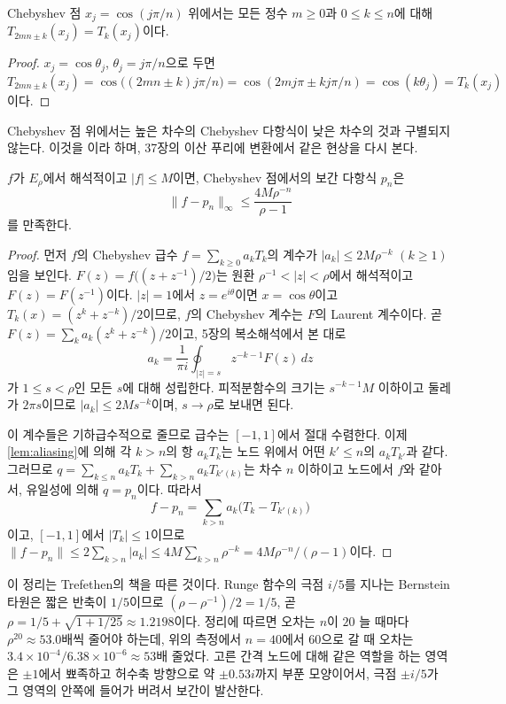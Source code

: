 \begin{lemma}
\label{lem:aliasing}
Chebyshev 점 $x_j=\cos(j\pi/n)$ 위에서는 모든 정수 $m\ge0$과 $0\le k\le n$에 대해 $T_{2mn\pm k}(x_j)=T_k(x_j)$이다.
\end{lemma}

\begin{proof}
$x_j=\cos\theta_j$, $\theta_j=j\pi/n$으로 두면 $T_{2mn\pm k}(x_j)=\cos\bigl((2mn\pm k)j\pi/n\bigr)=\cos(2mj\pi\pm kj\pi/n)=\cos(k\theta_j)=T_k(x_j)$이다.
\end{proof}

Chebyshev 점 위에서는 높은 차수의 Chebyshev 다항식이 낮은 차수의 것과 구별되지 않는다. 이것을 이라 하며, 37장의 이산 푸리에 변환에서 같은 현상을 다시 본다.

\begin{theorem}
\label{thm:cheb-interp-analytic}
$f$가 $E_\rho$에서 해석적이고 $|f|\le M$이면, Chebyshev 점에서의 보간 다항식 $p_n$은
\[
\|f-p_n\|_\infty\le\frac{4M\rho^{-n}}{\rho-1}
\]
를 만족한다.
\end{theorem}

\begin{proof}
먼저 $f$의 Chebyshev 급수 $f=\sum_{k\ge0}a_kT_k$의 계수가 $|a_k|\le2M\rho^{-k}$ $(k\ge1)$임을 보인다. $F(z)=f\bigl((z+z^{-1})/2\bigr)$는 원환 $\rho^{-1}<|z|<\rho$에서 해석적이고 $F(z)=F(z^{-1})$이다. $|z|=1$에서 $z=e^{i\theta}$이면 $x=\cos\theta$이고 $T_k(x)=(z^k+z^{-k})/2$이므로, $f$의 Chebyshev 계수는 $F$의 Laurent 계수이다. 곧 $F(z)=\sum_ka_k(z^k+z^{-k})/2$이고, 5장의 복소해석에서 본 대로
\[
a_k=\frac1{\pi i}\oint_{|z|=s}z^{-k-1}F(z)\,dz
\]
가 $1\le s<\rho$인 모든 $s$에 대해 성립한다. 피적분함수의 크기는 $s^{-k-1}M$ 이하이고 둘레가 $2\pi s$이므로 $|a_k|\le2Ms^{-k}$이며, $s\to\rho$로 보내면 된다.

이 계수들은 기하급수적으로 줄므로 급수는 $[-1,1]$에서 절대 수렴한다. 이제 \cref{lem:aliasing}에 의해 각 $k>n$의 항 $a_kT_k$는 노드 위에서 어떤 $k'\le n$의 $a_kT_{k'}$과 같다. 그러므로 $q=\sum_{k\le n}a_kT_k+\sum_{k>n}a_kT_{k'(k)}$는 차수 $n$ 이하이고 노드에서 $f$와 같아서, 유일성에 의해 $q=p_n$이다. 따라서
\[
f-p_n=\sum_{k>n}a_k\bigl(T_k-T_{k'(k)}\bigr)
\]
이고, $[-1,1]$에서 $|T_k|\le1$이므로 $\|f-p_n\|\le2\sum_{k>n}|a_k|\le4M\sum_{k>n}\rho^{-k}=4M\rho^{-n}/(\rho-1)$이다.
\end{proof}

이 정리는 Trefethen의 책\cite{trefethen2019atap}을 따른 것이다. Runge 함수의 극점 $i/5$를 지나는 Bernstein 타원은 짧은 반축이 $1/5$이므로 $(\rho-\rho^{-1})/2=1/5$, 곧 $\rho=1/5+\sqrt{1+1/25}\approx1.2198$이다. 정리에 따르면 오차는 $n$이 $20$ 늘 때마다 $\rho^{20}\approx53.0$배씩 줄어야 하는데, 위의 측정에서 $n=40$에서 $60$으로 갈 때 오차는 $3.4\times10^{-4}/6.38\times10^{-6}\approx53$배 줄었다. 고른 간격 노드에 대해 같은 역할을 하는 영역은 $\pm1$에서 뾰족하고 허수축 방향으로 약 $\pm0.53i$까지 부푼 모양이어서, 극점 $\pm i/5$가 그 영역의 안쪽에 들어가 버려서 보간이 발산한다.

